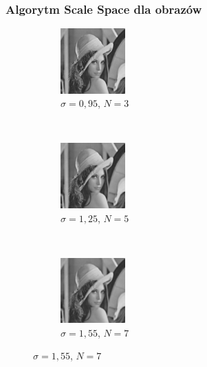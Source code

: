 \begin{frame}
	\frametitle{Algorytm Scale Space dla obrazów}

	\begin{figure}[h]
		\begin{center}
			\begin{subfigure}[b]{3.5cm}
				\centering
				\includegraphics[width=2.5cm]{Lena_scales1.jpg}
				\caption{$\sigma = 0,95$, $N = 3$}
			\end{subfigure}
			~
			\begin{subfigure}[b]{3.5cm}
				\centering
				\includegraphics[width=2.5cm]{Lena_scales2.jpg}
				\caption{$\sigma = 1,25$, $N = 5$}
			\end{subfigure}
			~
			\begin{subfigure}[b]{3.5cm}
				\centering
				\includegraphics[width=2.5cm]{Lena_scales3.jpg}
				\caption{$\sigma = 1,55$, $N = 7$}
			\end{subfigure}



\end{center}
\end{figure}
\end{frame}
